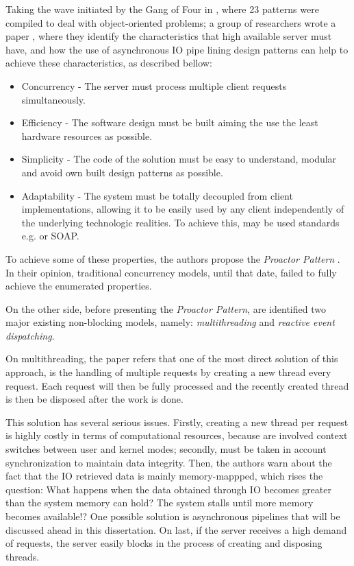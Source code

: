 Taking the wave initiated by the Gang of Four in \citep{gof}, where 23 patterns were compiled to deal with object-oriented problems; a group of researchers wrote a paper \citep{proactor}, where they identify the characteristics that high available server must have, and how the use of asynchronous IO pipe lining design patterns can help to achieve these characteristics, as described bellow:
\begin{itemize}
	\item Concurrency - The server must process multiple client requests simultaneously.\\
	\item Efficiency - The software design must be built aiming the use the least hardware resources as possible. \\
	\item Simplicity - The code of the solution must be easy to understand, modular and avoid own built design patterns as possible. \\
    \item Adaptability - The system must be totally decoupled from client implementations, allowing it to be easily used by any client independently of the underlying technologic realities. To achieve this, may be used standards e.g. \cite{REST} or SOAP.\\
\end{itemize}

To achieve some of these properties, the authors propose the \textit{Proactor Pattern} \citep{proactor}. In their opinion, traditional concurrency models, until that date, failed to fully achieve the enumerated properties.

On the other side, before presenting the \textit{Proactor Pattern}, are identified two major existing non-blocking models, namely: \textit{multithreading} and \textit{reactive event dispatching}. 

On multithreading, the paper refers that one of the most direct solution of this approach, is the handling of multiple requests by creating a new thread every request. Each request will then be fully processed and the recently created thread is then be disposed after the work is done. 

This solution has several serious issues. Firstly, creating a new thread per request is highly costly in terms of computational resources,
because are involved context switches between user and kernel modes; secondly, must be taken in account synchronization to maintain data integrity.
Then, the authors warn about the fact that the IO retrieved data is mainly memory-mappped, which rises the question: What happens when the data obtained through IO becomes greater than the system memory can hold? The system stalls until more memory becomes available!? One possible solution is asynchronous pipelines that will be discussed ahead in this dissertation.
On last, if the server receives a high demand of requests, the server easily blocks in the process of creating and disposing threads. 

